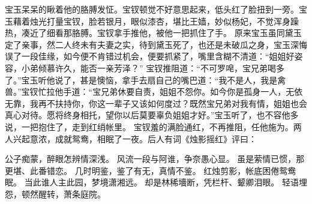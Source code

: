\documentclass[12pt,oneside]{book}
\begin{document}
宝玉呆呆的瞅着他的胳膊发怔。宝钗顿觉不好意思起来，低头红了脸扭到一旁。宝玉藉着烛光打量宝钗，脸若银月，眼似漆杏，堪比王嫱，妙似杨妃，不觉浑身躁热，凑近了细看那胳膊。宝钗拿手推他，被他一把抓住了手。
原来宝玉虽同黛玉定了亲事，然二人终未有夫妻之实，待到黛玉死了，也还是未破瓜之身，宝玉深悔误了一段佳缘，如今便不肯错过机会，便要抓紧了，嘴里含糊不清道：“姐姐好姿容，小弟倾慕许久，能否一亲芳泽？”
宝钗推阻道：“不可罗唣，宝兄弟喝多了。”宝玉听他说了，甚是懊恼，拿手去扇自己的嘴巴道：“我不是人，我是禽兽。”宝钗忙拉他手道：“宝兄弟休要自责，姐姐不怨你。如今你是孤身一人，无依无靠，我再不扶持你，你这一辈子又该如何度过？既然宝兄弟对我有情，姐姐也会真心对待。愿将终身相托，望你以后莫要辜负姐姐才好。”宝玉听了，也不容他多说，一把抱住了，走到红绡帐里。
宝钗羞的满脸通红，不再推阻，任他施为。两人兴起意浓，成就鸳鸯，相眠了一夜。后人有词《烛影摇红》评曰：

公子痴蒙，醉眼怎辨情深浅。
风流一段与阿谁，争奈愚心显。
虽是萦情已惯，那更堪、此番错恋。
几时明鉴，鉴了有无，真情不鉴。
红烛剪影，帐底困倦鸳鸯眠。
当此谁人主此园，梦境潇湘远。
却是林稀墻断，凭栏杆、颦卿泪眼。
轻语埋怨，顿然醒转，萧条庭院。
\end{document}
